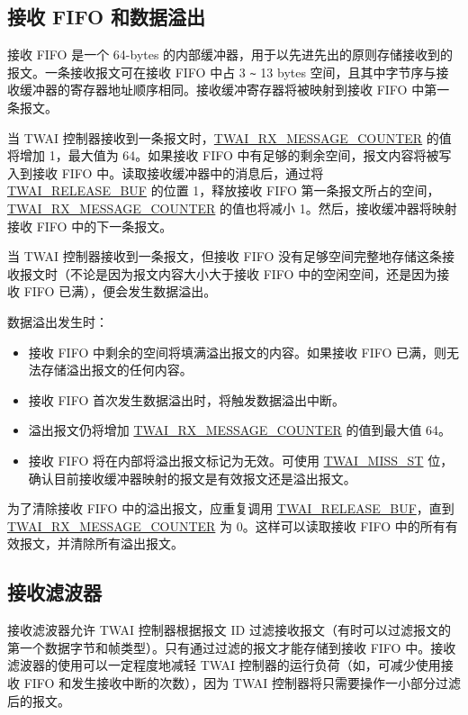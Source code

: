 \documentclass[main\_\_CN.tex]{subfiles}
\begin{document}
\subsection{接收 FIFO 和数据溢出}

接收 FIFO 是一个 64-bytes 的内部缓冲器，用于以先进先出的原则存储接收到的报文。一条接收报文可在接收 FIFO 中占 3 \verb+~+ 13 bytes 空间，且其中字节序与接收缓冲器的寄存器地址顺序相同。接收缓冲寄存器将被映射到接收 FIFO 中第一条报文。

当 TWAI 控制器接收到一条报文时，\hyperref[fielddesc:TWAIRXMESSAGECOUNTER]{TWAI\_RX\_MESSAGE\_COUNTER} 的值将增加 1，最大值为 64。如果接收 FIFO 中有足够的剩余空间，报文内容将被写入到接收 FIFO 中。读取接收缓冲器中的消息后，通过将 \hyperref[fielddesc:TWAIRELEASEBUF]{TWAI\_RELEASE\_BUF} 的位置 1，释放接收 FIFO 第一条报文所占的空间，\hyperref[fielddesc:TWAIRXMESSAGECOUNTER]{TWAI\_RX\_MESSAGE\_COUNTER} 的值也将减小 1。然后，接收缓冲器将映射接收 FIFO 中的下一条报文。

当 TWAI 控制器接收到一条报文，但接收 FIFO 没有足够空间完整地存储这条接收报文时（不论是因为报文内容大小大于接收 FIFO 中的空闲空间，还是因为接收 FIFO 已满），便会发生数据溢出。

数据溢出发生时：
\begin{itemize}
    \item 接收 FIFO 中剩余的空间将填满溢出报文的内容。如果接收 FIFO 已满，则无法存储溢出报文的任何内容。
    \item 接收 FIFO 首次发生数据溢出时，将触发数据溢出中断。
    \item 溢出报文仍将增加 \hyperref[fielddesc:TWAIRXMESSAGECOUNTER]{TWAI\_RX\_MESSAGE\_COUNTER} 的值到最大值 64。
    \item 接收 FIFO 将在内部将溢出报文标记为无效。可使用 \hyperref[fielddesc:TWAIMISSST]{TWAI\_MISS\_ST} 位，确认目前接收缓冲器映射的报文是有效报文还是溢出报文。
\end{itemize}

为了清除接收 FIFO 中的溢出报文，应重复调用 \hyperref[fielddesc:TWAIRELEASEBUF]{TWAI\_RELEASE\_BUF}，直到 \hyperref[fielddesc:TWAIRXMESSAGECOUNTER]{TWAI\_RX\_MESSAGE\_COUNTER} 为 0。这样可以读取接收 FIFO 中的所有有效报文，并清除所有溢出报文。

\subsection{接收滤波器}

接收滤波器允许 TWAI 控制器根据报文 ID 过滤接收报文（有时可以过滤报文的第一个数据字节和帧类型）。只有通过过滤的报文才能存储到接收 FIFO 中。接收滤波器的使用可以一定程度地减轻 TWAI 控制器的运行负荷（如，可减少使用接收 FIFO 和发生接收中断的次数），因为 TWAI 控制器将只需要操作一小部分过滤后的报文。
\end{document}
